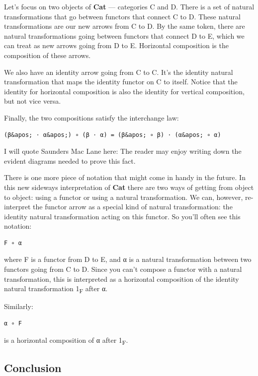 Let's focus on two objects of \textbf{Cat} --- categories C and D. There
is a set of natural transformations that go between functors that
connect C to D. These natural transformations are our new arrows from C
to D. By the same token, there are natural transformations going between
functors that connect D to E, which we can treat as new arrows going
from D to E. Horizontal composition is the composition of these arrows.

We also have an identity arrow going from C to C. It's the identity
natural transformation that maps the identity functor on C to itself.
Notice that the identity for horizontal composition is also the identity
for vertical composition, but not vice versa.

Finally, the two compositions satisfy the interchange law:

\begin{verbatim}
(β&apos; ⋅ α&apos;) ∘ (β ⋅ α) = (β&apos; ∘ β) ⋅ (α&apos; ∘ α)
\end{verbatim}

I will quote Saunders Mac Lane here: The reader may enjoy writing down
the evident diagrams needed to prove this fact.

There is one more piece of notation that might come in handy in the
future. In this new sideways interpretation of \textbf{Cat} there are
two ways of getting from object to object: using a functor or using a
natural transformation. We can, however, re-interpret the functor arrow
as a special kind of natural transformation: the identity natural
transformation acting on this functor. So you'll often see this
notation:

\begin{verbatim}
F ∘ α
\end{verbatim}

where F is a functor from D to E, and α is a natural transformation
between two functors going from C to D. Since you can't compose a
functor with a natural transformation, this is interpreted as a
horizontal composition of the identity natural transformation
1\textsubscript{F} after α.

Similarly:

\begin{verbatim}
α ∘ F
\end{verbatim}

is a horizontal composition of α after 1\textsubscript{F}.

\subsection{Conclusion}\label{conclusion}

